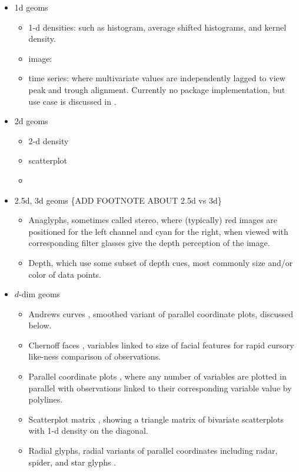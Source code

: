 \documentclass{monashthesis}
\begin{document}
\begin{itemize}
\tightlist
\item
  1d geoms

  \begin{itemize}
  \tightlist
  \item
    1-d densities: such as histogram, average shifted histograms\autocite{scott85}, and kernel density\autocite{scott95}.
  \item
    image: \autocite[ 2001]{Wegman}
  \item
    time series: where multivariate values are independently lagged to view peak and trough alignment. Currently no package implementation, but use case is discussed in \autocite{cook_manual_1997}.
  \end{itemize}
\item
  2d geoms

  \begin{itemize}
  \item
    2-d density \autocite[ GITHUB]{NS}
  \item
    scatterplot
  \item
  \end{itemize}
\item
  2.5d, 3d geoms \{ADD FOOTNOTE ABOUT 2.5d vs 3d\}

  \begin{itemize}
  \tightlist
  \item
    Anaglyphs, sometimes called stereo, where (typically) red images are positioned for the left channel and cyan for the right, when viewed with corresponding filter glasses give the depth perception of the image.
  \item
    Depth, which use some subset of depth cues, most commonly size and/or color of data points.
  \end{itemize}
\item
  \(d\)-dim geoms

  \begin{itemize}
  \tightlist
  \item
    Andrews curves \autocite{andrews_plots_1972}, smoothed variant of parallel coordinate plots, discussed below.
  \item
    Chernoff faces \autocite{chernoff_use_1973}, variables linked to size of facial features for rapid cursory like-ness comparison of observations.
  \item
    Parallel coordinate plots \autocite{ocagne_coordonnees_1885}, where any number of variables are plotted in parallel with observations linked to their corresponding variable value by polylines.
  \item
    Scatterplot matrix \autocite{becker_brushing_1987}, showing a triangle matrix of bivariate scatterplots with 1-d density on the diagonal.
  \item
    Radial glyphs, radial variants of parallel coordinates including radar, spider, and star glyphs \autocite{siegel_surgical_1972}.
  \end{itemize}
\end{itemize}
\end{document}
